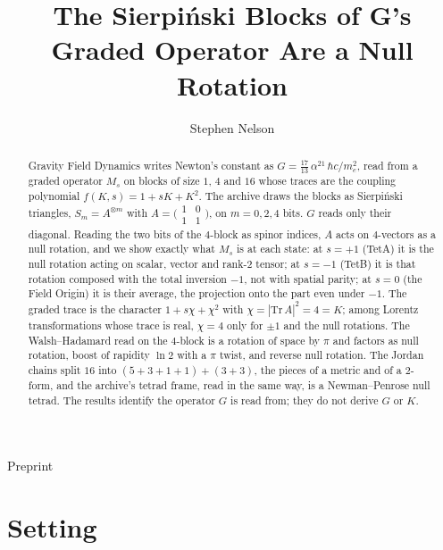 \documentclass[twocolumn]{iopjournal}
\renewcommand{\articletype}[1]{%
  {\vspace*{-8mm}\noindent \Large \sf Preprint}\par
  \vspace*{6mm}\noindent{\scriptsize \sf{\bfseries \MakeUppercase{#1}}}}
\begin{document}
\articletype{Supplementary Material}

\title{The Sierpi\'nski Blocks of G's Graded Operator Are a Null Rotation}

\author{Stephen Nelson}



\begin{abstract}
Gravity Field Dynamics writes Newton's constant as
$G = \tfrac{17}{13}\,\alpha^{21}\,\hbar c/m_e^2$, read from a graded
operator $M_s$ on blocks of size $1$, $4$ and $16$ whose traces are the
coupling polynomial $f(K,s) = 1 + sK + K^2$. The archive draws the
blocks as Sierpi\'nski triangles, $S_m = A^{\otimes m}$ with
$A = \bigl(\begin{smallmatrix}1&0\\1&1\end{smallmatrix}\bigr)$, on
$m = 0, 2, 4$ bits. $G$ reads only their diagonal. Reading the two bits
of the $4$-block as spinor indices, $A$ acts on $4$-vectors as a null
rotation, and we show exactly what $M_s$ is at each state: at
$s = +1$ (TetA) it is the null rotation acting on scalar, vector and
rank-$2$ tensor; at $s = -1$ (TetB) it is that rotation composed with
the total inversion $-1$, not with spatial parity; at $s = 0$ (the
Field Origin) it is their average, the projection onto the part even
under $-1$. The graded trace is the character $1 + s\chi + \chi^2$ with
$\chi = |\mathrm{Tr}\,A|^2 = 4 = K$; among Lorentz transformations
whose trace is real, $\chi = 4$ only for $\pm1$ and the null
rotations. The Walsh--Hadamard read on the $4$-block is a rotation of
space by $\pi$ and factors as null rotation, boost of rapidity $\ln 2$
with a $\pi$ twist, and reverse null rotation. The Jordan chains split
$16$ into $(5 + 3 + 1 + 1) + (3 + 3)$, the pieces of a metric and of a
$2$-form, and the archive's tetrad frame, read in the same way, is a
Newman--Penrose null tetrad. The results identify the operator $G$ is
read from; they do not derive $G$ or $K$.
\end{abstract}



\section*{Setting}
\end{document}

